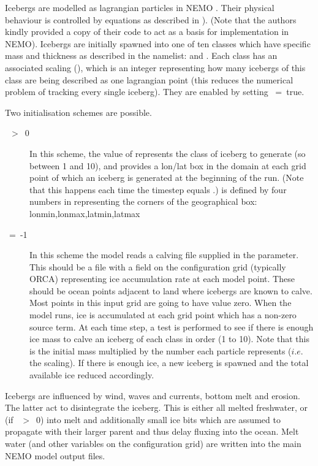 \documentclass[NEMO_book]{subfiles}
\begin{document}
Icebergs are modelled as lagrangian particles in NEMO \citep{Marsh_GMD2015}.
Their physical behaviour is controlled by equations as described in \citet{Martin_Adcroft_OM10} ).
(Note that the authors kindly provided a copy of their code to act as a basis for implementation in NEMO).
Icebergs are initially spawned into one of ten classes which have specific mass and thickness as described 
in the  namelist: 
 and .
Each class has an associated scaling (), which is an integer representing how many icebergs 
of this class are being described as one lagrangian point (this reduces the numerical problem of tracking every single iceberg).
They are enabled by setting ~=~true.

Two initialisation schemes are possible.
\begin{description}
\item[~$>$~0]
In this scheme, the value of  represents the class of iceberg to generate 
(so between 1 and 10), and  provides a lon/lat box in the domain at each 
grid point of which an iceberg is generated at the beginning of the run. 
(Note that this happens each time the timestep equals .)
 is defined by four numbers in  representing the corners 
of the geographical box: lonmin,lonmax,latmin,latmax
\item[~=~-1]
In this scheme the model reads a calving file supplied in the  parameter.
This should be a file with a field on the configuration grid (typically ORCA) representing ice accumulation rate at each model point. 
These should be ocean points adjacent to land where icebergs are known to calve.
Most points in this input grid are going to have value zero.
When the model runs, ice is accumulated at each grid point which has a non-zero source term.
At each time step, a test is performed to see if there is enough ice mass to calve an iceberg of each class in order (1 to 10).
Note that this is the initial mass multiplied by the number each particle represents ($i.e.$ the scaling).
If there is enough ice, a new iceberg is spawned and the total available ice reduced accordingly.
\end{description}

Icebergs are influenced by wind, waves and currents, bottom melt and erosion.
The latter act to disintegrate the iceberg. This is either all melted freshwater, or 
(if ~$>$~0) into melt and additionally small ice bits
which are assumed to propagate with their larger parent and thus delay fluxing into the ocean.
Melt water (and other variables on the configuration grid) are written into the main NEMO model output files.
\end{document}
